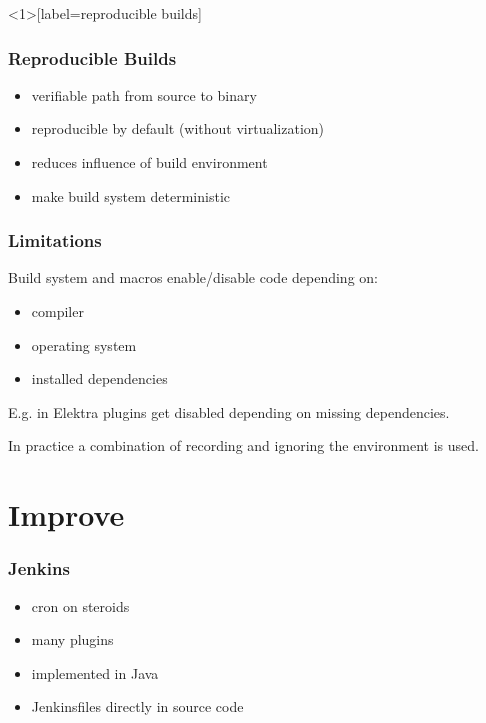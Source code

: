 \begin{frame}<1>[label=reproducible builds]
	\frametitle{Reproducible Builds}

	\begin{itemize}[<+-| alert@+>]

	\item verifiable path from source to binary
	\item reproducible by default (without virtualization)
	\item reduces influence of build environment
	\item make build system deterministic
	\end{itemize}
\end{frame}

\begin{frame}
	\frametitle{Limitations}

	Build system and macros enable/disable code depending on:

	\begin{itemize}
	\item compiler
	\item operating system
	\item installed dependencies
	\end{itemize}

	E.g. in Elektra plugins get disabled depending on missing dependencies.

	\pause
	\vspace{1cm}

	\begin{solution}
	In practice a combination of recording and ignoring the environment is used.
	\end{solution}
\end{frame}

\section{Improve}

\begin{frame}
	\frametitle{Jenkins}

	\begin{itemize}[<+-| alert@+>]

	\item cron on steroids
	\item many plugins
	\item implemented in Java
	\item Jenkinsfiles directly in source code
	\end{itemize}
\end{frame}

